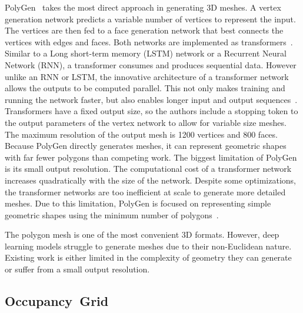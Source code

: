PolyGen~\cite{Nash2020} takes the most direct approach in generating 3D meshes. A vertex generation network predicts a variable number of vertices to represent the input. The vertices are then fed to a face generation network that best connects the vertices with edges and faces. Both networks are implemented as transformers~\cite{Nash2020}. Similar to a Long short-term memory (LSTM) network or a Recurrent Neural Network (RNN), a transformer consumes and produces sequential data. However unlike  an RNN or LSTM, the innovative architecture of a transformer network allows the outputs to be computed parallel. This not only makes training and running the network faster, but also enables longer input and output sequences~\cite{Vaswani2017}. Transformers have a fixed output size, so the authors include a stopping token to the output parameters of the vertex network to allow for variable size meshes. The maximum resolution of the output mesh is 1200 vertices and 800 faces. Because PolyGen directly generates meshes, it can represent geometric shapes with far fewer polygons than competing work. The biggest limitation of PolyGen is its small output resolution. The computational cost of a transformer network increases quadratically with the size of the network. Despite some optimizations, the transformer networks are too inefficient at scale to generate more detailed meshes. Due to this limitation, PolyGen is focused on representing simple geometric shapes using the minimum number of polygons~\cite{Nash2020}.

The polygon mesh is one of the most convenient 3D formats. However, deep learning models struggle to generate meshes due to their non-Euclidean nature. Existing work is either limited in the complexity of geometry they can generate or suffer from a small output resolution.

\newpage


\subsection{Occupancy~Grid}
\label{subsec:occupancy_grid}

